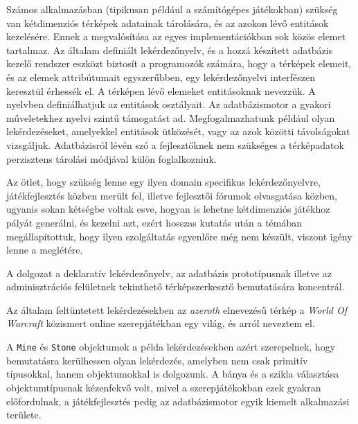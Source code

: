 
Számos alkalmazásban (tipikusan például a számítógépes játékokban) szükség  van kétdimenziós térképek adatainak tárolására, és az azokon lévő entitások kezelésére. Ennek a megvalósítása az egyes implementációkban sok közös elemet tartalmaz. Az általam definiált lekérdezőnyelv, és a hozzá készített adatbázis kezelő rendszer eszközt biztosít a programozók számára, hogy a térképek elemeit, és az elemek attribútumait egyszerűbben, egy lekérdezőnyelvi interfészen keresztül érhessék el. A térképen lévő elemeket entitásoknak nevezzük. A nyelvben definiálhatjuk az entitások osztályait. Az adatbázismotor a gyakori műveletekhez nyelvi szintű támogatást ad. Megfogalmazhatunk például olyan lekérdezéseket, amelyekkel entitások ütközését, vagy az azok közötti távolságokat vizsgáljuk. Adatbázisról lévén szó a fejlesztőknek nem szükséges a térképadatok perzisztens tárolási módjával külön foglalkozniuk.

Az ötlet, hogy szükség lenne egy ilyen domain specifikus lekérdezőnyelvre, játékfejlesztés közben merült fel, illetve fejlesztői fórumok olvasgatása közben, ugyanis sokan kétségbe voltak esve, hogyan is lehetne kétdimenziós játékhoz pályát generálni, és kezelni azt, ezért hosszas kutatás után a témában megállapítottuk, hogy ilyen szolgáltatás egyenlőre még nem készült, viszont igény lenne a meglétére.

A dolgozat a deklaratív lekérdezőnyelv, az adatbázis prototípusnak illetve az adminisztrációs felületnek tekinthető térképszerkesztő bemutatására koncentrál.

Az általam feltüntetett lekérdezésekben az \textit{azeroth} elnevezésű térkép a \textit{World Of Warcraft} közismert online szerepjátékban egy világ, és arról neveztem el.

A \texttt{Mine} és \texttt{Stone} objektumok a példa lekérdezésekben azért szerepelnek, hogy bemutatásra kerülhessen olyan lekérdezés, amelyben nem csak primitív típusokkal, hanem objektumokkal is dolgozunk. A bánya és a szikla választása objektumtípusnak kézenfekvő volt, mivel a szerepjátékokban ezek gyakran előfordulnak, a játékfejlesztés pedig az adatbázismotor egyik kiemelt alkalmazási területe.
